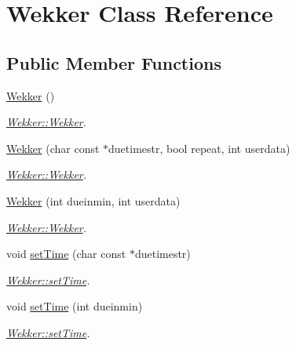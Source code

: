 \hypertarget{class_wekker}{}\section{Wekker Class Reference}
\label{class_wekker}
\subsection*{Public Member Functions}
\begin{DoxyCompactItemize}
\item 
\hypertarget{class_wekker_a6dfbdf69cc3f11a4b995ec3393a62507}{}\hyperlink{class_wekker_a6dfbdf69cc3f11a4b995ec3393a62507}{Wekker} ()\label{class_wekker_a6dfbdf69cc3f11a4b995ec3393a62507}

\begin{DoxyCompactList}\small\item\em \hyperlink{class_wekker_a6dfbdf69cc3f11a4b995ec3393a62507}{Wekker\+::\+Wekker}. \end{DoxyCompactList}\item 
\hyperlink{class_wekker_a430abbc87ca880cddbf18b89c07aabe8}{Wekker} (char const $\ast$duetimestr, bool repeat, int userdata)
\begin{DoxyCompactList}\small\item\em \hyperlink{class_wekker_a6dfbdf69cc3f11a4b995ec3393a62507}{Wekker\+::\+Wekker}. \end{DoxyCompactList}\item 
\hyperlink{class_wekker_a16083e8bda81545ec6abb84eb8a933e4}{Wekker} (int dueinmin, int userdata)
\begin{DoxyCompactList}\small\item\em \hyperlink{class_wekker_a6dfbdf69cc3f11a4b995ec3393a62507}{Wekker\+::\+Wekker}. \end{DoxyCompactList}\item 
void \hyperlink{class_wekker_ad22f1f5fbd543892690cc94bd1b586f5}{set\+Time} (char const $\ast$duetimestr)
\begin{DoxyCompactList}\small\item\em \hyperlink{class_wekker_ad22f1f5fbd543892690cc94bd1b586f5}{Wekker\+::set\+Time}. \end{DoxyCompactList}\item 
void \hyperlink{class_wekker_a0a6ca8af43c1525e66ccfeace3da5d7b}{set\+Time} (int dueinmin)
\begin{DoxyCompactList}\small\item\em \hyperlink{class_wekker_ad22f1f5fbd543892690cc94bd1b586f5}{Wekker\+::set\+Time}. \end{DoxyCompactList}\item 

\end{DoxyCompactItemize}

